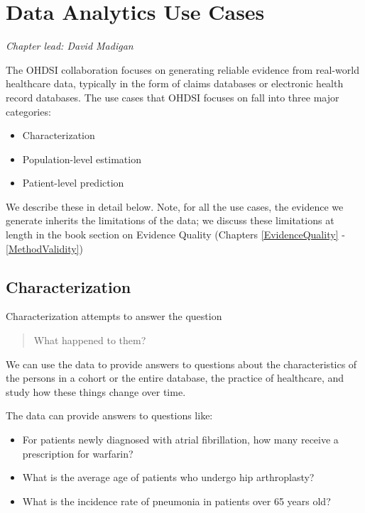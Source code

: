\documentclass[11pt]{book}
\providecommand{\tightlist}{%
  \setlength{\itemsep}{0pt}\setlength{\parskip}{0pt}}
\begin{document}
\chapter{Data Analytics Use Cases}\label{DataAnalyticsUseCases}

\emph{Chapter lead: David Madigan}

The OHDSI collaboration focuses on generating reliable evidence from
real-world healthcare data, typically in the form of claims databases or
electronic health record databases. The use cases that OHDSI focuses on
fall into three major categories:

\begin{itemize}
\tightlist
\item
  Characterization
\item
  Population-level estimation
\item
  Patient-level prediction
\end{itemize}

We describe these in detail below. Note, for all the use cases, the
evidence we generate inherits the limitations of the data; we discuss
these limitations at length in the book section on Evidence Quality
(Chapters \ref{EvidenceQuality} - \ref{MethodValidity})

\section{Characterization}\label{characterization}

Characterization attempts to answer the question

\begin{quote}
What happened to them?
\end{quote}

We can use the data to provide answers to questions about the
characteristics of the persons in a cohort or the entire database, the
practice of healthcare, and study how these things change over time.

The data can provide answers to questions like:

\begin{itemize}
\tightlist
\item
  For patients newly diagnosed with atrial fibrillation, how many
  receive a prescription for warfarin?
\item
  What is the average age of patients who undergo hip arthroplasty?
\item
  What is the incidence rate of pneumonia in patients over 65 years old?
\end{itemize}
\end{document}
